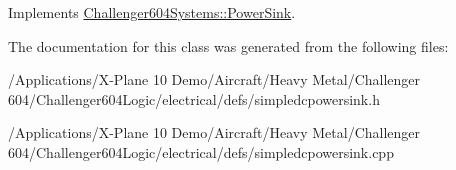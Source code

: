 Implements \hyperlink{class_challenger604_systems_1_1_power_sink_aeb901bdc03e7c2c5cef0ccc3ff078a89}{Challenger604\-Systems\-::\-Power\-Sink}.



The documentation for this class was generated from the following files\-:\begin{DoxyCompactItemize}
\item 
/\-Applications/\-X-\/\-Plane 10 Demo/\-Aircraft/\-Heavy Metal/\-Challenger 604/\-Challenger604\-Logic/electrical/defs/simpledcpowersink.\-h\item 
/\-Applications/\-X-\/\-Plane 10 Demo/\-Aircraft/\-Heavy Metal/\-Challenger 604/\-Challenger604\-Logic/electrical/defs/simpledcpowersink.\-cpp\end{DoxyCompactItemize}
